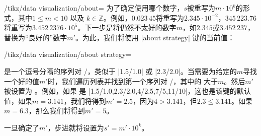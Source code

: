 \begin{key}{/tikz/data visualization/about=}
    为了确定使用哪个数字，$s$被重写为$m \cdot 10^k$的形式，其中$1 \le m < 10$ 以及 $k \in \mathbb Z$。例如，$0.023\,45$将重写为$2.345 \cdot 10^{-2}$，$345\,223.76$将重写为$3.452\,2376 \cdot 10^5$。下一步是将仍然不太好的数字$m$，如$2.345$或$3.452\,237$，替换为``良好的''数字$m'$。为此，我们将使用 |about strategy| 键的当前值：
    \begin{key}{/tikz/data visualization/about strategy=} %

         是一个逗号分隔的序列对 /，类似于 |1.5/1.0| 或 |2.3/2.0|。当需要为给定的$m$寻找一个好的值$m'$时，我们遍历列表并找到第一个序列对 /，其中的  大于$m$。然后$m'$被设置为 。例如，如果 是 |1.5/1.0,2.3/2.0,4/2.5,7/5,11/10|，这也是该键的默认值，如果$m=3.141$，我们将得到$m'=2.5$，因为$4 > 3.141$，但$2.3 \le 3.141$。如果$m=6.3$，那么我们将得到$m'=5$。

        
    \end{key}
    一旦确定了$m'$，步进就将设置为$s' = m' \cdot 10^k$。


    \def\showstrategy#1{
        \medskip
        \begin{tikzpicture}
          \foreach \max/\about [count=\c] in {10/5,20/5,30/5,40/5,50/5,60/5,70/5,80/5,90/5,100/5,100/3,100/10}
          {
            \begin{scope}[xshift=\c pt*30]
              \datavisualization [#1,
              one dimensional axis,
              axis={
                ticks={about=\about},
                include value=0,
                include value=\max
              }
              ];


\end{scope}}
\end{tikzpicture}}
\end{key}
